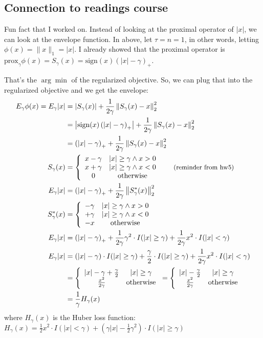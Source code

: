 \documentclass{article}
\begin{document}
\subsection{Connection to readings course}
Fun fact that I worked on. Instead of looking at the proximal operator of $|x|$, we can look at the envelope function.
In  above, let $\tau=n=1$, in other words, letting $\phi(x)=\lVert x\rVert_1=|x|$. I already showed that the
proximal operator is $\textrm{prox}_\gamma \phi(x)=S_\gamma(x)=\textrm{sign}(x)\left(|x|-\gamma\right)_+$.

That's the $\arg\min$ of the regularized objective. So, we can plug that into the regularized objective and we get
the envelope:
\begin{align*}
E_\gamma \phi(x)=E_\gamma |x|&=\left|S_\gamma(x)\right|+\frac{1}{2\gamma}\left\lVert S_\gamma(x) - x \right\rVert_2^2\\
&=\left|\textrm{sign}(x)\left(|x|-\gamma\right)_+\right|+\frac{1}{2\gamma}\left\lVert S_\gamma(x) - x \right\rVert_2^2\\
&=\left(|x|-\gamma\right)_+ + \frac{1}{2\gamma}\left\lVert S_\gamma(x) - x \right\rVert_2^2\\
S_\gamma(x)&=\left\{\begin{array}{cc}
x-\gamma & |x| \geq \gamma \wedge x > 0\\
x + \gamma & |x| \geq \gamma \wedge x < 0\\
0 & \textrm{otherwise}
\end{array}\right.~~~~~{\small\textrm{(reminder from hw5)}}\\
E_\gamma |x|&=\left(|x|-\gamma\right)_+ + \frac{1}{2\gamma}\left\lVert S_\gamma^*(x) \right\rVert_2^2\\
S_\gamma^*(x)&=\left\{\begin{array}{cc}
-\gamma & |x| \geq \gamma \wedge x > 0\\
+ \gamma & |x| \geq \gamma \wedge x < 0\\
-x & \textrm{otherwise}
\end{array}\right.\\
E_\gamma |x|&=\left(|x|-\gamma\right)_+ + \frac{1}{2\gamma} \gamma^2 \cdot I(|x|\geq\gamma) + \frac{1}{2\gamma} x^2 \cdot I(|x|<\gamma)\\
E_\gamma |x|&=\left(|x|-\gamma\right)\cdot I(|x|\geq\gamma) + \frac{\gamma}{2} \cdot I(|x|\geq\gamma) + \frac{1}{2\gamma} x^2 \cdot I(|x|<\gamma)\\
&=\left\{\begin{array}{cc}
|x|-\gamma+\frac{\gamma}{2} & |x| \geq \gamma\\
\frac{x^2}{2\gamma} & \textrm{otherwise}
\end{array}\right.=\left\{\begin{array}{cc}
|x|-\frac{\gamma}{2} & |x| \geq \gamma\\
\frac{x^2}{2\gamma} & \textrm{otherwise}
\end{array}\right.\\
&=\frac{1}{\gamma} H_\gamma(x)
\end{align*}
where $H_\gamma(x)$ is the Huber loss function: $H_\gamma(x) = \frac{1}{2}x^2 \cdot I(|x|<\gamma) + \left(\gamma|x|-\frac{1}{2}\gamma^2\right)\cdot I(|x|\geq \gamma)$
\end{document}
